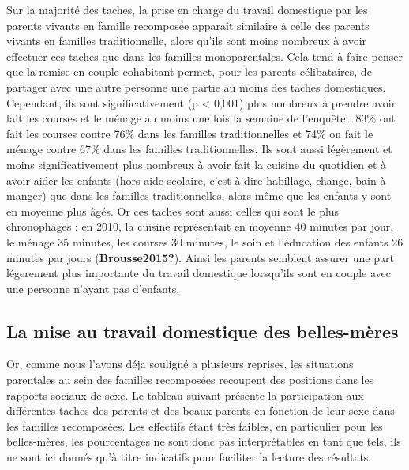 \documentclass[
  12pt,
]{book}
\begin{document}
Sur la majorité des taches, la prise en charge du travail domestique par
les parents vivants en famille recomposée apparaît similaire à celle des
parents vivants en familles traditionnelle, alors qu'ils sont moins
nombreux à avoir effectuer ces taches que dans les familles
monoparentales. Cela tend à faire penser que la remise en couple
cohabitant permet, pour les parents célibataires, de partager avec une
autre personne une partie au moins des taches domestiques. Cependant,
ils sont significativement (p \textless{} 0,001) plus nombreux à prendre
avoir fait les courses et le ménage au moins une fois la semaine de
l'enquête : 83\% ont fait les courses contre 76\% dans les familles
traditionnelles et 74\% on fait le ménage contre 67\% dans les familles
traditionnelles. Ils sont aussi légèrement et moins significativement
plus nombreux à avoir fait la cuisine du quotidien et à avoir aider les
enfants (hors aide scolaire, c'est-à-dire habillage, change, bain à
manger) que dans les familles traditionnelles, alors même que les
enfants y sont en moyenne plus âgés. Or ces taches sont aussi celles qui
sont le plus chronophages : en 2010, la cuisine représentait en moyenne
40 minutes par jour, le ménage 35 minutes, les courses 30 minutes, le
soin et l'éducation des enfants 26 minutes par jours
(\textbf{Brousse2015?}). Ainsi les parents semblent assurer une part
légerement plus importante du travail domestique lorsqu'ils sont en
couple avec une personne n'ayant pas d'enfants.

\subsection{La mise au travail domestique des
belles-mères}\label{la-mise-au-travail-domestique-des-belles-muxe8res}

Or, comme nous l'avons déja souligné a plusieurs reprises, les
situations parentales au sein des familles recomposées recoupent des
positions dans les rapports sociaux de sexe. Le tableau suivant présente
la participation aux différentes taches des parents et des beaux-parents
en fonction de leur sexe dans les familles recomposées. Les effectifs
étant très faibles, en particulier pour les belles-mères, les
pourcentages ne sont donc pas interprétables en tant que tels, ils ne
sont ici donnés qu'à titre indicatifs pour faciliter la lecture des
résultats.

\begingroup\fontsize{7}{9}\selectfont
\begingroup\fontsize{8}{10}\selectfont
\end{document}
